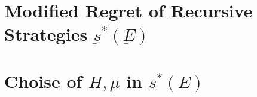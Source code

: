 \documentclass[11pt]{article}
\theoremstyle{boldStyle}
\begin{document}
\newpage
\section{Modified Regret of Recursive Strategies $\underbar{s}^*(\underbar{E})$}





\newpage
\section{Choise of $\underbar{H}, \mu$ in $\underbar{s}^*(\underbar{E})$}
\end{document}
